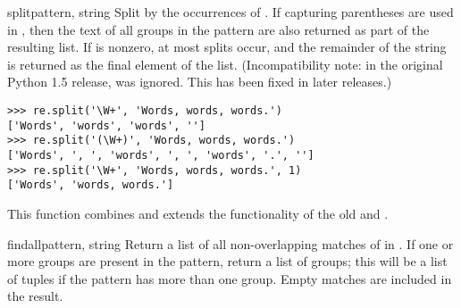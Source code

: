 \begin{funcdesc}{split}{pattern, string}
  Split  by the occurrences of .  If
  capturing parentheses are used in , then the text of all
  groups in the pattern are also returned as part of the resulting list.
  If  is nonzero, at most  splits
  occur, and the remainder of the string is returned as the final
  element of the list.  (Incompatibility note: in the original Python
  1.5 release,  was ignored.  This has been fixed in
  later releases.)

\begin{verbatim}
>>> re.split('\W+', 'Words, words, words.')
['Words', 'words', 'words', '']
>>> re.split('(\W+)', 'Words, words, words.')
['Words', ', ', 'words', ', ', 'words', '.', '']
>>> re.split('\W+', 'Words, words, words.', 1)
['Words', 'words, words.']
\end{verbatim}

  This function combines and extends the functionality of
  the old  and .
\end{funcdesc}

\begin{funcdesc}{findall}{pattern, string}
Return a list of all non-overlapping matches of  in
.  If one or more groups are present in the pattern,
return a list of groups; this will be a list of tuples if the pattern
has more than one group.  Empty matches are included in the result.
\end{funcdesc}

